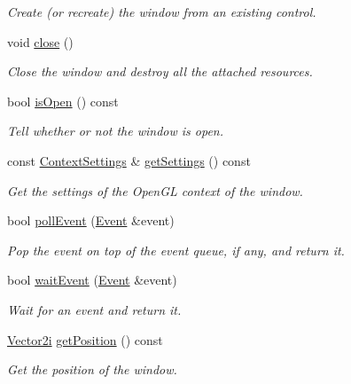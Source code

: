 \begin{DoxyCompactItemize}
\begin{DoxyCompactList}\small\item\em Create (or recreate) the window from an existing control. \end{DoxyCompactList}\item 
void \hyperlink{classsf_1_1_window_a99d1e030387b0c26f5995670504fe7b5}{close} ()
\begin{DoxyCompactList}\small\item\em Close the window and destroy all the attached resources. \end{DoxyCompactList}\item 
bool \hyperlink{classsf_1_1_window_ae873503db7d48157bb9cbf6129562bce}{is\+Open} () const
\begin{DoxyCompactList}\small\item\em Tell whether or not the window is open. \end{DoxyCompactList}\item 
const \hyperlink{structsf_1_1_context_settings}{Context\+Settings} \& \hyperlink{classsf_1_1_window_ae5b8065e92bbd0408e1fd8328e80d7d1}{get\+Settings} () const
\begin{DoxyCompactList}\small\item\em Get the settings of the Open\+GL context of the window. \end{DoxyCompactList}\item 
bool \hyperlink{classsf_1_1_window_a338e996585faf82e93069858e3b531b7}{poll\+Event} (\hyperlink{classsf_1_1_event}{Event} \&event)
\begin{DoxyCompactList}\small\item\em Pop the event on top of the event queue, if any, and return it. \end{DoxyCompactList}\item 
bool \hyperlink{classsf_1_1_window_aaf02ab64fbc1d374eef3696df54137bc}{wait\+Event} (\hyperlink{classsf_1_1_event}{Event} \&event)
\begin{DoxyCompactList}\small\item\em Wait for an event and return it. \end{DoxyCompactList}\item 
\hyperlink{classsf_1_1_vector2}{Vector2i} \hyperlink{classsf_1_1_window_a420028b8e4d9baedcaaba7b2047b8cb3}{get\+Position} () const
\begin{DoxyCompactList}\small\item\em Get the position of the window. \end{DoxyCompactList}\item 

\end{DoxyCompactItemize}
